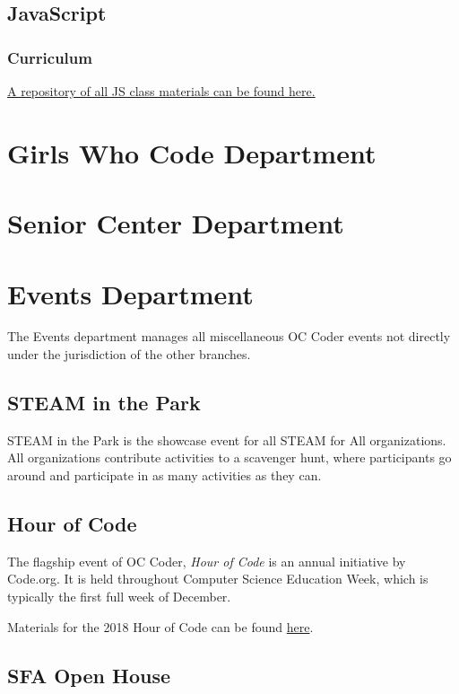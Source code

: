 \documentclass[twoside,11pt,letterpaper,abstracton]{scrartcl}
\begin{document}
\subsection{JavaScript} \label{jcc-js}

\subsubsection{Curriculum}

\begin{resource}
    \href{https://drive.google.com/drive/folders/12zgeKhSd9gEaBEMIkI69AUVnp-plVbqc?usp=sharing}{A repository of all JS class materials can be found here.}
\end{resource}

\newpage

\section{Girls Who Code Department} \label{gwc}

\newpage

\section{Senior Center Department} \label{seniorcenter}

\newpage

\section{Events Department} \label{events}

The Events department manages all miscellaneous OC Coder events not directly under the jurisdiction of the other branches. 

\subsection{STEAM in the Park} \label{events-sitp}

STEAM in the Park is the showcase event for all STEAM for All organizations. All organizations contribute activities to a scavenger hunt, where participants go around and participate in as many activities as they can.

\subsection{Hour of Code} \label{events-hoc}

The flagship event of OC Coder, \emph{Hour of Code} is an annual initiative by Code.org. It is held throughout Computer Science Education Week, which is typically the first full week of December.

\begin{resource}
    Materials for the 2018 Hour of Code can be found \href{https://drive.google.com/drive/folders/1VpVb9J50TpbheRf9bMmjayy6Iqel5Pwd?usp=sharing}{here}.
\end{resource}

\subsection{SFA Open House} \label{events-openhouse}
\end{document}
